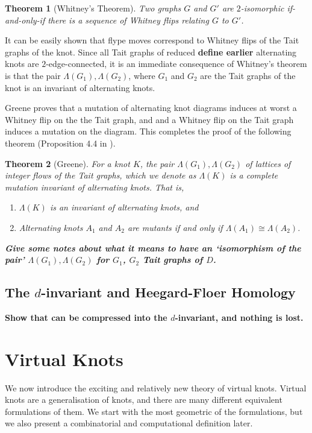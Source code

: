 \documentclass[12pt]{report}
\newcommand{\notered}[1]{{\color{Red} \textbf{#1}}}
\newcommand{\notegreen}[1]{{\color{Green} \textbf{#1}}}
\newtheorem*{theorem}{Theorem}
\begin{document}
\begin{theorem}[Whitney's Theorem]
Two graphs $G$ and $G'$ are $2$-isomorphic if-and-only-if there is a sequence of Whitney flips relating $G$ to $G'$.
\end{theorem}

It can be easily shown that flype moves correspond to Whitney flips of the Tait graphs of the knot. Since all Tait graphs of reduced \notered{define earlier} alternating knots are $2$-edge-connected, it is an immediate consequence of Whitney's theorem is that the pair $\Lambda(G_{1}), \Lambda(G_{2})$, where $G_{1}$ and $G_{2}$ are the Tait graphs of the knot is an invariant of alternating knots.

Greene proves that a mutation of alternating knot diagrams induces at worst a Whitney flip on the the Tait graph, and and a Whitney flip on the Tait graph induces a mutation on the diagram. This completes the proof of the following theorem (Proposition 4.4 in \cite{lattices-graphs-mutation}).

\begin{theorem}[Greene]
For a knot $K$, the pair $\Lambda(G_{1}), \Lambda(G_{2})$ of lattices of integer flows of the Tait graphs, which we denote as $\Lambda(K)$ is a complete mutation invariant of alternating knots. That is,
\begin{enumerate}[(1)]
\item $\Lambda(K)$ is an invariant of alternating knots, and
\item Alternating knots $A_{1}$ and $A_{2}$ are mutants if and only if $\Lambda(A_{1}) \cong \Lambda(A_{2})$.
\end{enumerate}
\notered{Give some notes about what it means to have an `isomorphism of the pair' $\Lambda(G_{1}), \Lambda(G_{2})$ for $G_{1}$, $G_{2}$ Tait graphs of $D$.}

\end{theorem}

\section{\notegreen{The $d$-invariant and Heegard-Floer Homology}}
\notegreen{Show that can be compressed into the $d$-invariant, and nothing is lost.}

\chapter{Virtual Knots}


We now introduce the exciting and relatively new theory of virtual knots. Virtual knots are a generalisation of knots, and there are many different equivalent formulations of them. We start with the most geometric of the formulations, but we also present a combinatorial and computational definition later.
\end{document}
